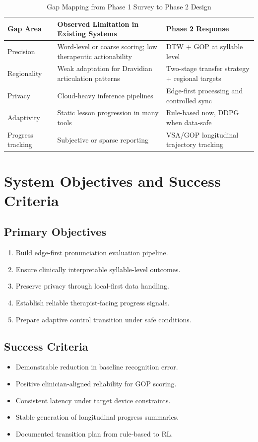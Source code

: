 \documentclass[12pt,a4paper]{article}
\begin{document}
\begin{table}[H]
\centering
\caption{Gap Mapping from Phase 1 Survey to Phase 2 Design}
\renewcommand{\arraystretch}{1.25}
\begin{tabularx}{\textwidth}{|p{3.2cm}|L|L|}
\hline
\textbf{Gap Area} & \textbf{Observed Limitation in Existing Systems} & \textbf{Phase 2 Response} \\
\hline
Precision & Word-level or coarse scoring; low therapeutic actionability & DTW + GOP at syllable level \\
\hline
Regionality & Weak adaptation for Dravidian articulation patterns & Two-stage transfer strategy + regional targets \\
\hline
Privacy & Cloud-heavy inference pipelines & Edge-first processing and controlled sync \\
\hline
Adaptivity & Static lesson progression in many tools & Rule-based now, DDPG when data-safe \\
\hline
Progress tracking & Subjective or sparse reporting & VSA/GOP longitudinal trajectory tracking \\
\hline
\end{tabularx}
\end{table}

\section{System Objectives and Success Criteria}
\subsection{Primary Objectives}
\begin{enumerate}[noitemsep,topsep=2pt]
\item Build edge-first pronunciation evaluation pipeline.
\item Ensure clinically interpretable syllable-level outcomes.
\item Preserve privacy through local-first data handling.
\item Establish reliable therapist-facing progress signals.
\item Prepare adaptive control transition under safe conditions.
\end{enumerate}

\subsection{Success Criteria}
\begin{itemize}[noitemsep,topsep=2pt]
\item Demonstrable reduction in baseline recognition error.
\item Positive clinician-aligned reliability for GOP scoring.
\item Consistent latency under target device constraints.
\item Stable generation of longitudinal progress summaries.
\item Documented transition plan from rule-based to RL.
\end{itemize}
\end{document}
